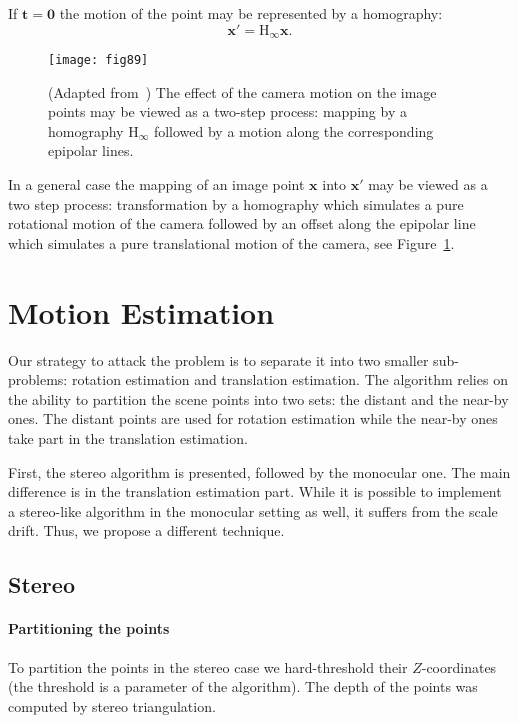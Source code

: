 If $\mathbf{t} = \mathbf{0}$ the motion of the point may be represented by a homography:
\begin{equation}
\mathbf{x}' = \mathrm{H_\infty}\mathbf{x}.
\end{equation}

\begin{figure}[h]
  \centering
  \texttt{[image: fig89]}
  \caption{(Adapted from~\cite{Hartley2004}) The effect of the camera motion on
    the image points may be viewed as a two-step process: mapping by a
    homography $\mathrm{H_\infty}$ followed by a motion along the corresponding
    epipolar lines.}
  \label{fig:two_step_motion}
\end{figure}

In a general case the mapping of an image point $\mathbf{x}$ into
$\mathbf{x}'$ may be viewed as a two step process: transformation by a
homography which simulates a pure rotational motion of the camera
followed by an offset along the epipolar line which simulates a pure
translational motion of the camera, see
Figure~\ref{fig:two_step_motion}.

\section{Motion Estimation}\label{sec:moest}

Our strategy to attack the problem is to separate it into two smaller
sub-problems: rotation estimation and translation estimation. The
algorithm relies on the ability to partition the scene points into two
sets: the distant and the near-by ones.  The distant points are used
for rotation estimation while the near-by ones take part in the
translation estimation.

First, the stereo algorithm is presented, followed by the monocular
one.  The main difference is in the translation estimation part. While
it is possible to implement a stereo-like algorithm in the monocular
setting as well, it suffers from the scale drift.  Thus, we propose a
different technique.


\subsection{Stereo}\label{sec:stereo_moest}
\paragraph{Partitioning the points} To partition the points in the
stereo case we hard-threshold their $Z$-coordinates (the threshold is
a parameter of the algorithm).  The depth of the points was computed
by stereo triangulation.

